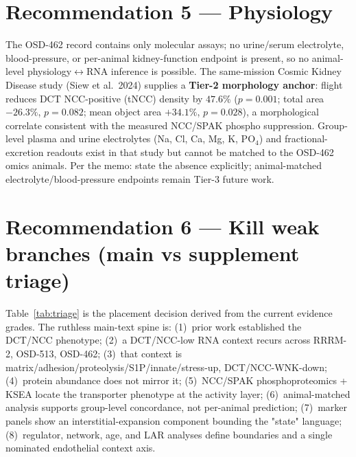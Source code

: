 \documentclass[10pt]{article}
\begin{document}
\section*{Recommendation 5 --- Physiology }
The OSD-462 record contains only molecular assays; no urine/serum electrolyte,
blood-pressure, or per-animal kidney-function endpoint is present, so no
animal-level physiology$\leftrightarrow$RNA inference is possible. The same-mission
Cosmic Kidney Disease study (Siew et al.\ 2024) supplies a \textbf{Tier-2
morphology anchor}: flight reduces DCT NCC-positive (tNCC) density by $47.6\%$
($p=0.001$; total area $-26.3\%$, $p=0.082$; mean object area $+34.1\%$,
$p=0.028$), a morphological correlate consistent with the measured NCC/SPAK
phospho suppression. Group-level plasma and urine electrolytes (Na, Cl, Ca, Mg, K,
PO$_4$) and fractional-excretion readouts exist in that study but cannot be
matched to the OSD-462 omics animals. Per the memo: state the absence explicitly;
animal-matched electrolyte/blood-pressure endpoints remain Tier-3 future work.

\section*{Recommendation 6 --- Kill weak branches (main vs supplement triage)}
Table~\ref{tab:triage} is the placement decision derived from the current evidence
grades. The ruthless main-text spine is: (1)~prior work established the DCT/NCC
phenotype; (2)~a DCT/NCC-low RNA context recurs across RRRM-2, OSD-513, OSD-462;
(3)~that context is matrix/adhesion/proteolysis/S1P/innate/stress-up,
DCT/NCC-WNK-down; (4)~protein abundance does not mirror it; (5)~NCC/SPAK
phosphoproteomics + KSEA locate the transporter phenotype at the activity layer;
(6)~animal-matched analysis supports group-level concordance, not per-animal
prediction; (7)~marker panels show an interstitial-expansion component bounding the
"state" language; (8)~regulator, network, age, and LAR analyses define boundaries
and a single nominated endothelial context axis.
\end{document}
